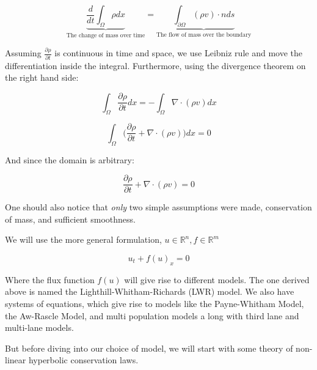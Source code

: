 \documentclass{article}
\numberwithin{equation}{section}
\begin{document}
\begin{equation}
    \underbrace{\frac{d}{dt} \int_{\Omega} \rho dx }_{ \text{The change of mass over time}}  = \underbrace{\int_{\partial \Omega} (\rho v) \cdot n ds }_{\text{The flow of mass over the boundary}}
\end{equation}

Assuming $\frac{\partial \rho}{\partial t}$ is continuous in time and space, we use Leibniz rule and move the differentiation inside the integral. Furthermore, using the divergence theorem on the right hand side: 

\begin{equation}
    \int_{\Omega} \frac{\partial \rho}{\partial t} dx   = - \int_{\Omega} \nabla \cdot (\rho v)dx 
\end{equation}

\begin{equation}
    \int_{\Omega} \big ( \frac{\partial \rho}{\partial t}  + \nabla \cdot (\rho v) \big ) dx   = 0 
\end{equation}

And since the domain is arbitrary: 

\begin{equation}
    \frac{\partial \rho}{\partial t}  + \nabla \cdot (\rho v) = 0
\label{Burgers}
\end{equation}

One should also notice that \textit{only} two simple assumptions were made, conservation of mass, and sufficient smoothness. 

We will use the more general formulation, $u \in \mathbb{R}^n, f \in \mathbb{R}^m$ 

\begin{equation}
    u_t + f(u)_x = 0 
    \label{Equation}
\end{equation}

Where the flux function $f(u)$ will give rise to different models. The one derived above is named the Lighthill-Whitham-Richards (LWR) model. We also have systems of equations, which give rise to models like the Payne-Whitham Model, the Aw-Rascle Model, and multi population models a long with third lane and multi-lane models. 

But before diving into our choice of model, we will start with some theory of non-linear hyperbolic conservation laws.

\end{document}
